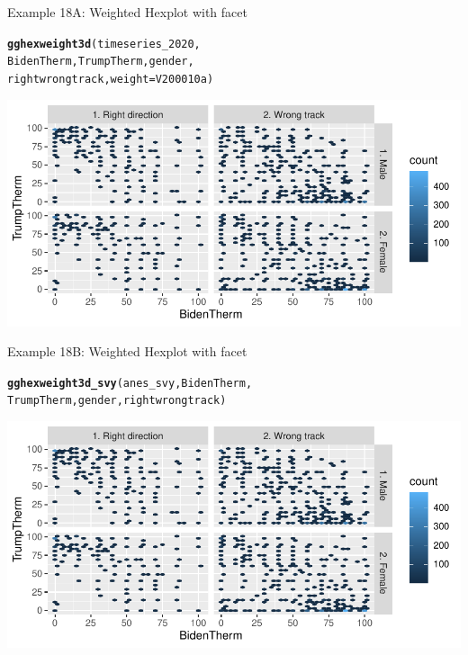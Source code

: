 \documentclass{beamer}\usepackage[]{graphicx}\usepackage[]{xcolor}
\makeatletter
\newcommand{\hlstd}[1]{\textcolor[rgb]{0.345,0.345,0.345}{#1}}%
\newcommand{\hlkwc}[1]{\textcolor[rgb]{0.333,0.667,0.333}{#1}}%
\newcommand{\hlkwd}[1]{\textcolor[rgb]{0.737,0.353,0.396}{\textbf{#1}}}%
\newenvironment{kframe}{%
 \def\at@end@of@kframe{}%
 \ifinner\ifhmode%
  \def\at@end@of@kframe{\end{minipage}}%
  \begin{minipage}{\columnwidth}%
 \fi\fi%
 \def\FrameCommand##1{\hskip\@totalleftmargin \hskip-\fboxsep
 \colorbox{shadecolor}{##1}\hskip-\fboxsep
     \hskip-\linewidth \hskip-\@totalleftmargin \hskip\columnwidth}%
 \MakeFramed {\advance\hsize-\width
   \@totalleftmargin\z@ \linewidth\hsize
   \@setminipage}}%
 {\par\unskip\endMakeFramed%
 \at@end@of@kframe}
\newenvironment{knitrout}{}{} %
\makeatother
\begin{document}
\begin{frame}[fragile]{Example 18A: Weighted Hexplot with facet}
\begin{knitrout}
\color{fgcolor}\begin{kframe}
\begin{alltt}
\hlkwd{gghexweight3d}\hlstd{(timeseries_2020,}
    \hlstd{BidenTherm, TrumpTherm, gender,}
    \hlstd{rightwrongtrack,} \hlkwc{weight} \hlstd{= V200010a)}
\end{alltt}
\end{kframe}
\includegraphics[width=0.95\linewidth]{figure/unnamed-chunk-86-1} 
\end{knitrout}

\end{frame}


\begin{frame}[fragile]{Example 18B: Weighted Hexplot with facet}

\begin{knitrout}
\color{fgcolor}\begin{kframe}
\begin{alltt}
\hlkwd{gghexweight3d_svy}\hlstd{(anes_svy, BidenTherm,}
    \hlstd{TrumpTherm, gender, rightwrongtrack)}
\end{alltt}
\end{kframe}
\includegraphics[width=0.95\linewidth]{figure/unnamed-chunk-87-1} 
\end{knitrout}

\end{frame}
\end{document}
